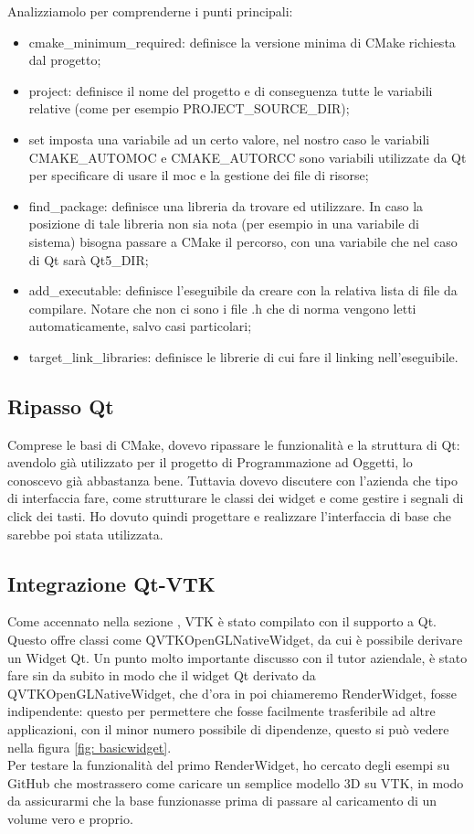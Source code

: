 Analizziamolo per comprenderne i punti principali:
\begin{itemize}
	\item cmake\_minimum\_required: definisce la versione minima di CMake richiesta dal progetto;
	\item project: definisce il nome del progetto e di conseguenza tutte le variabili relative (come per esempio PROJECT\_SOURCE\_DIR);
	\item set imposta una variabile ad un certo valore, nel nostro caso le variabili CMAKE\_AUTOMOC e CMAKE\_AUTORCC sono variabili utilizzate da Qt per specificare di usare il moc e la gestione dei file di risorse;
	\item find\_package: definisce una libreria da trovare ed utilizzare. In caso la posizione di tale libreria non sia nota (per esempio in una variabile di sistema) bisogna passare a CMake il percorso, con una variabile che nel caso di Qt sarà Qt5\_DIR;
	\item add\_executable: definisce l'eseguibile da creare con la relativa lista di file da compilare. Notare che non ci sono i file .h che di norma vengono letti automaticamente, salvo casi particolari;
	\item target\_link\_libraries: definisce le librerie di cui fare il linking nell'eseguibile.
\end{itemize}

\subsection{Ripasso Qt}
Comprese le basi di CMake, dovevo ripassare le funzionalità e la struttura di Qt: avendolo già utilizzato per il progetto di Programmazione ad Oggetti, lo conoscevo già abbastanza bene. Tuttavia dovevo discutere con l'azienda che tipo di interfaccia fare, come strutturare le classi dei widget e come gestire i segnali di click dei tasti. Ho dovuto quindi progettare e realizzare l'interfaccia di base che sarebbe poi stata utilizzata.

\subsection{Integrazione Qt-VTK}
Come accennato nella sezione , VTK è stato compilato con il supporto a Qt. Questo offre classi come QVTKOpenGLNativeWidget, da cui è possibile derivare un Widget Qt. Un punto molto importante discusso con il tutor aziendale, è stato fare sin da subito in modo che il widget Qt derivato da QVTKOpenGLNativeWidget, che d'ora in poi chiameremo RenderWidget, fosse indipendente: questo per permettere che fosse facilmente trasferibile ad altre applicazioni, con il minor numero possibile di dipendenze, questo si può vedere nella figura \ref{fig: basicwidget}.
\\
Per testare la funzionalità del primo RenderWidget, ho cercato degli esempi su GitHub che mostrassero come caricare un semplice modello 3D su VTK, in modo da assicurarmi che la base funzionasse prima di passare al caricamento di un volume vero e proprio.

